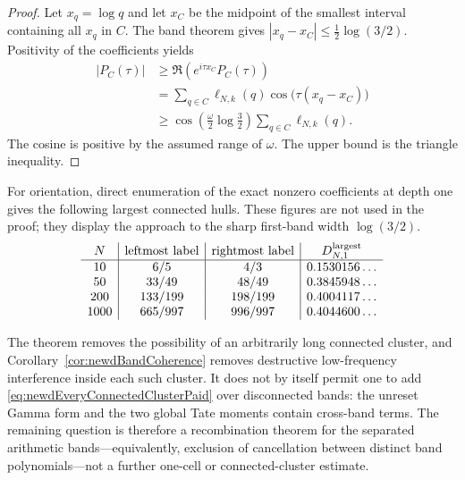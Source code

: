 \begin{proof}
Let $x_q=\log q$ and let $x_C$ be the midpoint of the smallest interval
containing all $x_q$ in $C$.  The band theorem gives
$|x_q-x_C|\leq\tfrac12\log(3/2)$.  Positivity of the coefficients yields
\begin{align*}
 |P_C(\tau)|
 &\geq \Re\!\left(e^{i\tau x_C}P_C(\tau)\right)\\
 &=\sum_{q\in C}\ell_{N,k}(q)
       \cos\bigl(\tau(x_q-x_C)\bigr)\\
 &\geq
 \cos\!\left(\frac{\omega}{2}\log\frac32\right)
 \sum_{q\in C}\ell_{N,k}(q).
\end{align*}
The cosine is positive by the assumed range of $\omega$.  The upper bound
is the triangle inequality.
\end{proof}

For orientation, direct enumeration of the exact nonzero coefficients at
depth one gives the following largest connected hulls.  These figures are
not used in the proof; they display the approach to the sharp first-band
width $\log(3/2)$.
\[
\begin{array}{c|c|c|c}
N&\text{leftmost label}&\text{rightmost label}&
 D_{N,1}^{\rm largest}\\ \hline
10&6/5&4/3&0.1530156\ldots\\
50&33/49&48/49&0.3845948\ldots\\
200&133/199&198/199&0.4004117\ldots\\
1000&665/997&996/997&0.4044600\ldots
\end{array}
\]

The theorem removes the possibility of an arbitrarily long connected
cluster, and Corollary~\ref{cor:newdBandCoherence} removes destructive
low-frequency interference inside each such cluster.  It does not by
itself permit one to add
\eqref{eq:newdEveryConnectedClusterPaid} over disconnected bands: the
unreset Gamma form and the two global Tate moments contain cross-band
terms.  The remaining question is therefore a recombination theorem for
the separated arithmetic bands---equivalently, exclusion of cancellation
between distinct band polynomials---not a further one-cell or
connected-cluster estimate.

